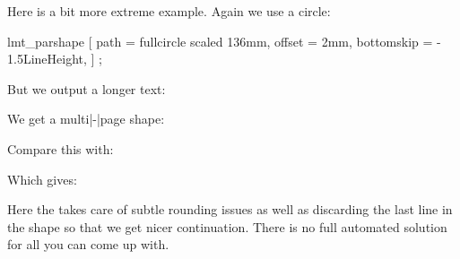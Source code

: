 \startplacefigure[Title=Multiple shapes,reference=fig:shapes:chain]
    \getbuffer
\stopplacefigure

Here is a bit more extreme example. Again we use a circle:

\startbuffer
{}
    lmt_parshape [
        path       = fullcircle scaled 136mm,
        offset     = 2mm,
        bottomskip = - 1.5LineHeight,
    ] ;
\stopuseMPgraphic
\stopbuffer

\typebuffer[option=TEX]

But we output a longer text:

\startbuffer
\startshapedparagraph[list=circle,mp=circle,repeat=yes,method=cycle]%
    \dontcomplain
    {\darkred     {}}\par
    {\darkgreen   {}}\par
    {\darkblue    {}}\par
    {\darkcyan    {}}\par
    {\darkmagenta {}}\par
\stopshapedparagraph
\stopbuffer

\typebuffer[option=TEX]

We get a multi|-|page shape:

\start \getbuffer \stop

Compare this with:

\startbuffer
\startshapedparagraph[list=circle,mp=circle,repeat=yes,method=cycle]%
    \dontcomplain
    {\darkred     {}}
    {\darkgreen   {}}
    {\darkblue    {}}
    {\darkcyan    {}}
    {\darkmagenta {}}
\stopshapedparagraph
\stopbuffer

\typebuffer[option=TEX]

Which gives:

\start \getbuffer \stop

Here the  takes care of subtle rounding issues as well as
discarding the last line in the shape so that we get nicer continuation. There is
no full automated solution for all you can come up with.

\stopsection

\startsection[title=Modes]


